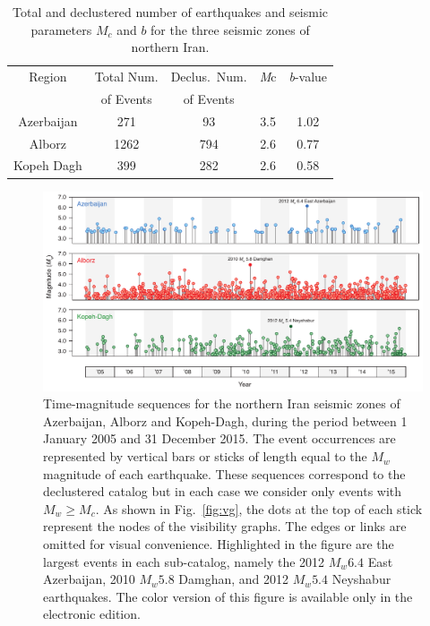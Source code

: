\begin{table}
	\selectfont
	\caption{Total and declustered number of earthquakes and seismic parameters $M_c$ and $b$ for the three seismic zones of northern Iran.}
	\centering\small
	\begin{tabular}{|ccccc|}
		\hline
		Region      & Total Num. & Declus.~Num. & \textit{M}c & \textit{b}-value \\ 
		            & of Events  & of Events &             &                  \\
		\hline
		Azerbaijan  &        271 &        93 &         3.5 &             1.02 \\
		Alborz      &       1262 &       794 &         2.6 &             0.77 \\
		Kopeh Dagh  &        399 &       282 &         2.6 &             0.58 \\
		\hline
	\end{tabular}
	\label{tab:seismicity}
\end{table}

\begin{figure}[t]
	\centering
	\includegraphics[width=\textwidth]{figures/pdf/figure-05} 
	\caption{Time-magnitude sequences for the northern Iran seismic zones of Azerbaijan, Alborz and Kopeh-Dagh, during the period between 1 January 2005 and 31 December 2015. The event occurrences are represented by vertical bars or sticks of length equal to the $M_w$ magnitude of each earthquake. These sequences correspond to the declustered catalog but in each case we consider only events with $M_w \geq M_c$. As shown in Fig.~\ref{fig:vg}, the dots at the top of each stick represent the nodes of the visibility graphs. The edges or links are omitted for visual convenience. Highlighted in the figure are the largest events in each sub-catalog, namely the 2012 $M_w 6.4$ East Azerbaijan, 2010 $M_w 5.8$ Damghan, and 2012 $M_w 5.4$ Neyshabur earthquakes. The color version of this figure is available only in the electronic edition.}
	\label{fig:mag-time}
\end{figure}

